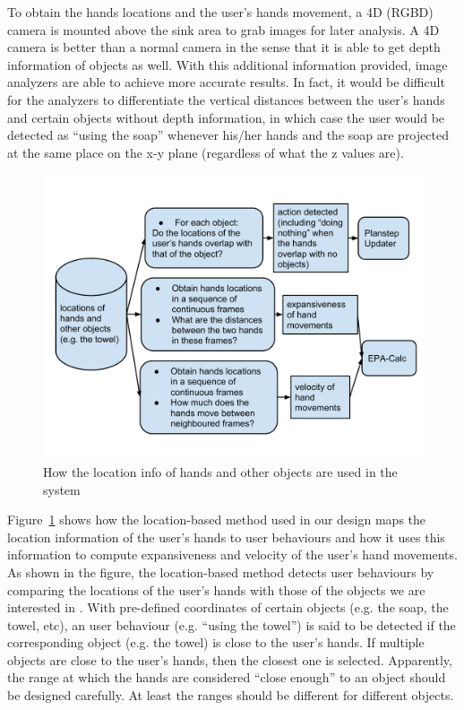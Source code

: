 To obtain the hands locations and the user's hands movement, a 4D (RGBD) camera is mounted above the sink area to grab images for later analysis. A 4D camera is better than a normal camera in the sense that it is able to get depth information of objects as well. With this additional information provided, image analyzers are able to achieve more accurate results. In fact, it would be difficult for the analyzers to differentiate the vertical distances between the user's hands and certain objects without depth information, in which case the user would be detected as ``using the soap'' whenever his/her hands and the soap are projected at the same place on the x-y plane (regardless of what the z values are). 

\begin{figure}[p]
\centering
\includegraphics[width=\linewidth]{fig-location-use.pdf}
\caption{How the location info of hands and other objects are used in the system}
\label{fig:location-use}
\end{figure}

Figure~\ref{fig:location-use} shows how the location-based method used in our design maps the location information of the user's hands to user behaviours and how it uses this information to compute expansiveness and velocity of the user's hand movements. As shown in the figure, the location-based method detects user behaviours by comparing the locations of the user's hands with those of the objects we are interested in \cite{boger2005decision, czarnuch2014}. With pre-defined coordinates of certain objects (e.g. the soap, the towel, etc), an user behaviour (e.g. ``using the towel'') is said to be detected if the corresponding object (e.g. the towel) is close to the user's hands. If multiple objects are close to the user's hands, then the closest one is selected. Apparently, the range at which the hands are considered ``close enough'' to an object should be designed carefully. At least the ranges should be different for different objects. 

